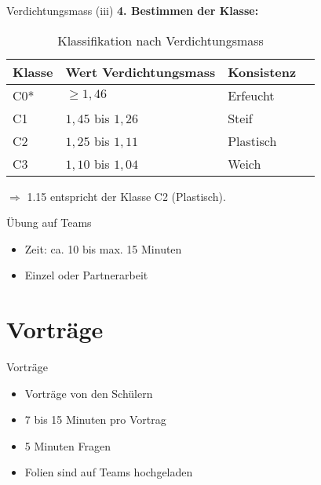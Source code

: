 \begin{frame}{Verdichtungsmass (iii)}
\textbf{4. Bestimmen der Klasse:}

\begin{table}[h]
\centering
\begin{tabular}{@{}lllc@{}}
\toprule
\textbf{Klasse} & \textbf{Wert Verdichtungsmass} & \textbf{Konsistenz} \\
\midrule
C0* & $\geq 1{,}46$         & Erfeucht \\
C1  & $1{,}45$ bis $1{,}26$ & Steif       \\
C2  & $1{,}25$ bis $1{,}11$ & Plastisch   \\
C3  & $1{,}10$ bis $1{,}04$ & Weich       \\
\bottomrule
\end{tabular}
\caption{Klassifikation nach Verdichtungsmass}
\end{table}

\hspace{1cm}

$\Rightarrow$ 1.15 entspricht der Klasse C2 (Plastisch).


\end{frame}

\begin{frame}{Übung auf Teams}
\begin{itemize}
    \item Zeit: ca. 10 bis max. 15 Minuten 
    \item Einzel oder Partnerarbeit
\end{itemize}
\end{frame}



\section{Vorträge}
\BlueSectionSlide

\begin{frame}{Vorträge}
    \begin{itemize}
        \item[\textbullet] Vorträge von den Schülern
        \item[\textbullet] 7 bis 15 Minuten pro Vortrag
        \item[\textbullet] 5 Minuten Fragen
        \item[\textbullet] Folien sind auf Teams hochgeladen
    \end{itemize}
\end{frame}

